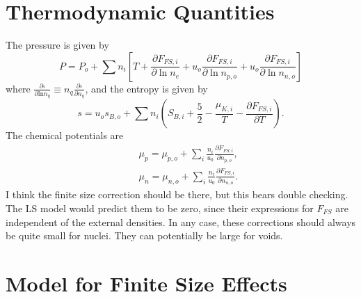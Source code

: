 \documentclass[11pt,letter]{article}
\begin{document}
\section{Thermodynamic Quantities} 
The pressure is given by 
\begin{equation}
P = P_o + \sum n_i \left[ T + \frac{\partial F_{FS,i}}{\partial \ln n_e} 
+ u_o \frac{\partial F_{FS,i}}{\partial \ln n_{p,o}} 
+ u_o \frac{\partial F_{FS,i}}{\partial \ln n_{n,o}} \right]  
\end{equation}
where $\frac{\partial \square }{\partial \text{ln}n_q } \equiv n_q \frac{\partial \square }{\partial n_q }$, 
and the entropy is given by 
\begin{equation}
s = u_o s_{B,o} + \sum n_i \left(S_{B,i} + \frac{5}{2} - \frac{\mu_{K,i}}{T} 
- \frac{\partial F_{FS,i}}{\partial T}\right).
\end{equation}
The chemical potentials are 
\begin{eqnarray}
&& \mu_p = \mu_{p,o} + \sum_i \frac{n_i}{u_0} \frac{\partial F_{FS,i}}{\partial n_{p,o}}, \\
&& \mu_n = \mu_{n,o} + \sum_i \frac{n_i}{u_0} \frac{\partial F_{FS,i}}{\partial n_{n,o}}.
\end{eqnarray}
I think the finite size correction should be there, but this bears double
checking.  The LS model would predict them to be zero, since their expressions for
$F_{FS}$ are independent of the external densities.  In any case, these 
corrections should always be quite small for nuclei.  They can potentially be 
large for voids.

\section{Model for Finite Size Effects}
\end{document}
